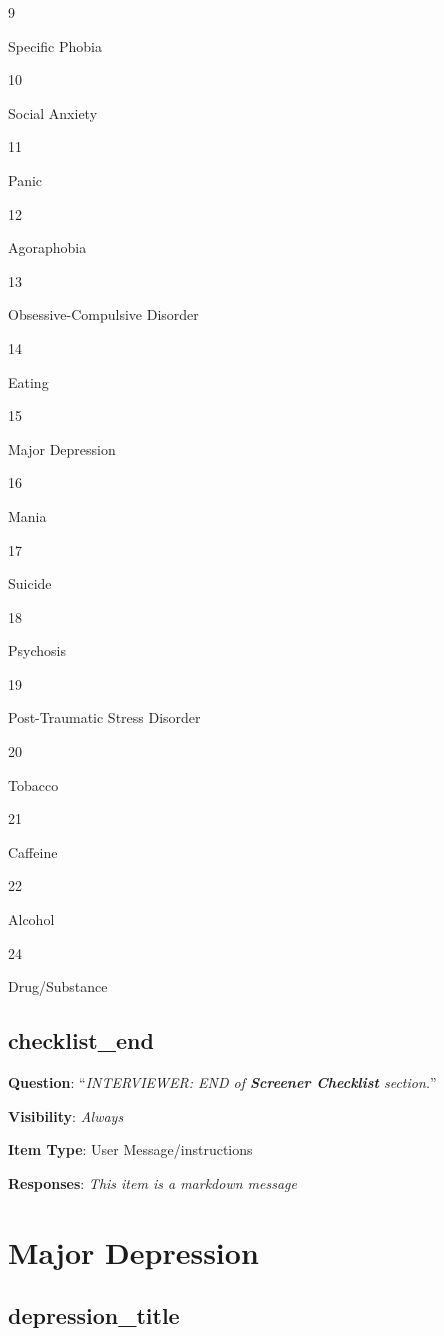 \documentclass[]{book}
\begin{document}
9

Specific Phobia

10

Social Anxiety

11

Panic

12

Agoraphobia

13

Obsessive-Compulsive Disorder

14

Eating

15

Major Depression

16

Mania

17

Suicide

18

Psychosis

19

Post-Traumatic Stress Disorder

20

Tobacco

21

Caffeine

22

Alcohol

24

Drug/Substance

\hypertarget{checklist_end}{%
\section{checklist\_end}\label{checklist_end}}

\textbf{Question}: ``\emph{INTERVIEWER: END of \textbf{Screener Checklist} section.}''

\textbf{Visibility}: \emph{Always}

\textbf{Item Type}: User Message/instructions

\textbf{Responses}: \emph{This item is a markdown message}

\hypertarget{context_section}{%
\chapter{Major Depression}\label{context_section}}

\hypertarget{depression_title}{%
\section{depression\_title}\label{depression_title}}
\end{document}
